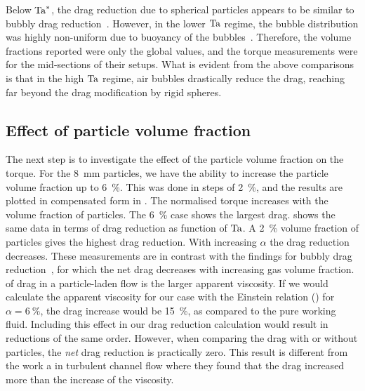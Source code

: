 %
\indent Below $\text{Ta}^*$, the drag reduction due to spherical particles appears to be
similar to bubbly drag reduction~\citep{vanGils2013}. However, in the lower
$\text{Ta}$ regime, the bubble distribution was highly non-uniform due to buoyancy
of the bubbles~\citep{vandenBerg2005,vanGils2013,Verschoof2016}. Therefore,
the volume fractions reported were only the global values, and the torque
measurements were for the mid-sections of their setups. What is evident from
the above comparisons is that in the high $\text{Ta}$ regime, air bubbles
drastically reduce the drag, reaching far beyond the drag modification by
rigid spheres.
\newpage
\subsection{Effect of particle volume fraction}\label{subsec:volumeFraction}
The next step is to investigate the effect of the particle volume fraction on
the torque. For the \SI{8}{\milli\metre} particles, we have the ability to
increase the particle volume fraction up to \SI{6}{\percent}. This was done in
steps of \SI{2}{\percent}, and the results are plotted in compensated form in
. The normalised torque increases with the volume
fraction of particles. The \SI{6}{\percent} case shows the largest drag.
 shows the same data in terms of drag reduction as
function of $\text{Ta}$. A \SI{2}{\percent} volume fraction of particles gives the
highest drag reduction. With increasing $\alpha$ the drag reduction decreases.
These measurements are in contrast with the findings for bubbly drag
reduction~\citep{vanGils2013}, for which the net drag decreases with
increasing gas volume fraction.
of drag in a particle-laden flow is the larger apparent viscosity.  If we
would calculate the apparent viscosity for our case with the Einstein relation
() for $\alpha=\SI{6}{\percent}$, the drag increase
would be \SI{15}{\percent}, as compared to the pure working fluid.  Including
this effect in our drag reduction calculation would result in reductions of
the same order.  However, when comparing the drag with or without particles,
the \emph{net} drag reduction is practically zero. This result is different
from the work a in turbulent channel flow where they found
that the drag increased more than the increase of the viscosity\citep{Picano2015}.

